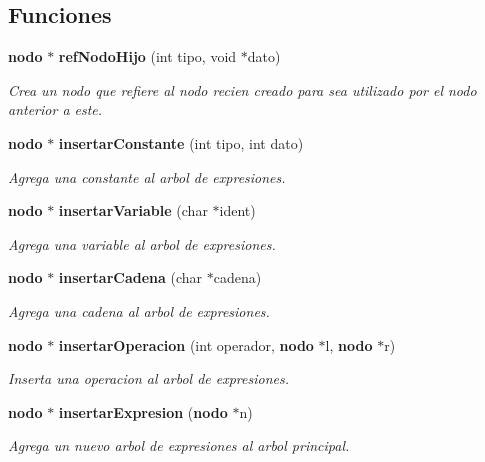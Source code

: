 \subsection*{Funciones}
\begin{CompactItemize}
\item 
{\bf nodo} $\ast$ {\bf ref\-Nodo\-Hijo} (int tipo, void $\ast$dato)
\begin{CompactList}\small\item\em Crea un nodo que refiere al nodo recien creado para sea utilizado por el nodo anterior a este. \item\end{CompactList}\item 
{\bf nodo} $\ast$ {\bf insertar\-Constante} (int tipo, int dato)
\begin{CompactList}\small\item\em Agrega una constante al arbol de expresiones. \item\end{CompactList}\item 
{\bf nodo} $\ast$ {\bf insertar\-Variable} (char $\ast$ident)
\begin{CompactList}\small\item\em Agrega una variable al arbol de expresiones. \item\end{CompactList}\item 
{\bf nodo} $\ast$ {\bf insertar\-Cadena} (char $\ast$cadena)
\begin{CompactList}\small\item\em Agrega una cadena al arbol de expresiones. \item\end{CompactList}\item 
{\bf nodo} $\ast$ {\bf insertar\-Operacion} (int operador, {\bf nodo} $\ast$l, {\bf nodo} $\ast$r)
\begin{CompactList}\small\item\em Inserta una operacion al arbol de expresiones. \item\end{CompactList}\item 
{\bf nodo} $\ast$ {\bf insertar\-Expresion} ({\bf nodo} $\ast$n)
\begin{CompactList}\small\item\em Agrega un nuevo arbol de expresiones al arbol principal. \item\end{CompactList}\item 

\end{CompactItemize}
